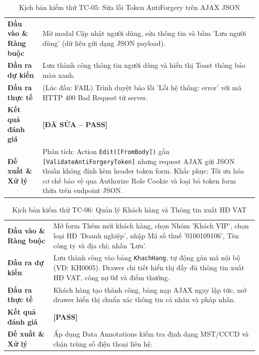\documentclass[12pt,a4paper]{report}
\renewcommand{\_}{\textunderscore\allowbreak}
\begin{document}
\begin{table}[H]
\centering
\small
\renewcommand{\arraystretch}{1.25}
\begin{tabularx}{\textwidth}{|p{3.8cm}|Y|}
\hline
{}
 \\
\hline
\textbf{Đầu vào \& Ràng buộc} & Mở modal Cập nhật người dùng, sửa thông tin và bấm 'Lưu người dùng' (dữ liệu gửi dạng JSON payload). \\
\hline
\textbf{Đầu ra dự kiến} & Lưu thành công thông tin người dùng và hiển thị Toast thông báo màu xanh. \\
\hline
\textbf{Đầu ra thực tế} & (Lúc đầu: FAIL) Trình duyệt báo lỗi 'Lỗi hệ thống: error' với mã HTTP 400 Bad Request từ server. \\
\hline
\textbf{Kết quả đánh giá} & \textbf{[ĐÃ SỬA -- PASS]} \\
\hline
\textbf{Đề xuất \& Xử lý} & Phân tích: Action \texttt{Edit([FromBody])} gắn \texttt{[ValidateAntiForgeryToken]} nhưng request AJAX gửi JSON thuần không đính kèm header token form. Khắc phục: Tối ưu hóa cơ chế bảo vệ qua Authorize Role Cookie và loại bỏ token form thừa trên endpoint JSON. \\
\hline
\end{tabularx}
\caption{Kịch bản kiểm thử TC-05: Sửa lỗi Token AntiForgery trên AJAX JSON}
\label{tab:tc5}
\end{table}

\begin{table}[H]
\centering
\small
\renewcommand{\arraystretch}{1.25}
\begin{tabularx}{\textwidth}{|p{3.8cm}|Y|}
\hline
{}
 \\
\hline
\textbf{Đầu vào \& Ràng buộc} & Mở form Thêm mới khách hàng, chọn Nhóm 'Khách VIP', chọn loại HĐ 'Doanh nghiệp', nhập Mã số thuế '0100109106', Tên công ty và địa chỉ; nhấn 'Lưu'. \\
\hline
\textbf{Đầu ra dự kiến} & Lưu thành công vào bảng \texttt{KhachHang}, tự động gán mã nội bộ (VD: KH0005). Drawer chi tiết hiển thị đầy đủ thông tin xuất HĐ VAT, công nợ 0đ và điểm thưởng. \\
\hline
\textbf{Đầu ra thực tế} & Khách hàng tạo thành công, bảng nạp AJAX ngay lập tức, mở drawer hiển thị chuẩn xác thông tin cá nhân và pháp nhân. \\
\hline
\textbf{Kết quả đánh giá} & \textbf{[PASS]} \\
\hline
\textbf{Đề xuất \& Xử lý} & Áp dụng Data Annotations kiểm tra định dạng MST/CCCD và chặn trùng số điện thoại liên hệ. \\
\hline
\end{tabularx}
\caption{Kịch bản kiểm thử TC-06: Quản lý Khách hàng và Thông tin xuất HĐ VAT}
\label{tab:tc6}
\end{table}
\end{document}
